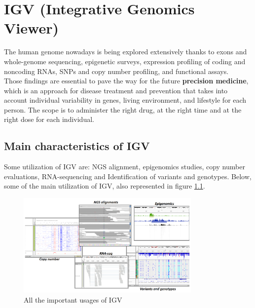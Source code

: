 \graphicspath{{chapters/notes/04/images}}
\chapter{IGV (Integrative Genomics Viewer)} \label{chap: IGV}
The human genome nowadays is being explored extensively thanks to exons and
whole-genome sequencing, epigenetic surveys, expression profiling of coding and noncoding RNAs, SNPs and copy number profiling, and functional assays.\\
Those findings are essential to pave the way for the future \textbf{precision medicine}, which is an approach for disease treatment and prevention that takes into account individual variability in genes, living environment, and lifestyle for each person. The scope is to administer the right drug, at the right time and at the right dose for each individual.

\section{Main characteristics of IGV}
Some utilization of IGV are: NGS alignment, epigenomics studies, copy number evaluations, RNA-sequencing and Identification of variants and genotypes.
Below, some of the main utilization of IGV, also represented in figure \ref{fig:IGVusages}.

\begin{figure}[H]
    \centering
    \includegraphics[width=0.8\textwidth]{usagesIGV.PNG}
    \caption{All the important usages of IGV}
    \label{fig:IGVusages}
\end{figure}


